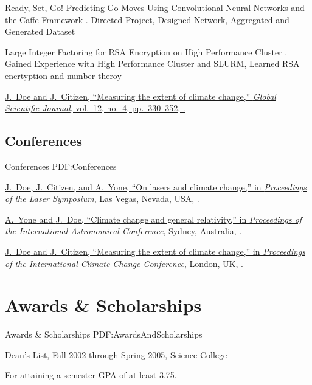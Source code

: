 \documentclass[letterpaper,MMMyyyy,nonstop]{simpleresumecv}
\begin{document}
\begin{body}
\GapNoBreak
{\BulletItem Ready, Set, Go! Predicting Go Moves Using Convolutional Neural Networks and the Caffe Framework
.}
\SubBulletItem Directed Project, Designed Network, Aggregated and Generated Dataset

\GapNoBreak
{\BulletItem Large Integer Factoring for RSA Encryption on High Performance Cluster
.}
\SubBulletItem Gained Experience with High Performance Cluster and SLURM, Learned RSA encrtyption and number theroy

\Gap
\NumberedItem{{\CharSpace}[1]}
\href{http://www.example.com/my-paper-doi-4}
{\underline{J.~Doe} and J.~Citizen,
``Measuring the extent of climate change,''
\textit{Global Scientific Journal},
vol.~12,
no.~4,
pp.~330--352,
.}

\BigGap
\subsection
{Conferences}
{Conferences}
{PDF:Conferences}

\GapNoBreak
\NumberedItem{[11]}
\href{http://www.example.com/my-paper-doi-3}
{\underline{J.~Doe}, J.~Citizen, and A.~Yone,
``On lasers and climate change,''
in \textit{Proceedings of the Laser Symposium},
Las Vegas, Nevada, USA,
.}

\Gap
\NumberedItem{[10]}
\href{http://www.example.com/my-paper-doi-2}
{A.~Yone and \underline{J.~Doe},
``Climate change and general relativity,''
in \textit{Proceedings of the International Astronomical Conference},
Sydney, Australia,
.}

\Gap
\NumberedItem{{\CharSpace}[1]}
\href{http://www.example.com/my-paper-doi-1}
{\underline{J.~Doe} and J.~Citizen,
``Measuring the extent of climate change,''
in \textit{Proceedings of the International Climate Change Conference},
London, UK,
.}


\section
{Awards \&\newline
Scholarships}
{Awards \& Scholarships}
{PDF:AwardsAndScholarships}

\BulletItem
Dean's List,
Fall 2002 through Spring 2005,
Science College
\hfill
{} --
\begin{detail}
\SubItem
For attaining a semester GPA of at least 3.75.
\end{detail}


\end{body}
\end{document}
